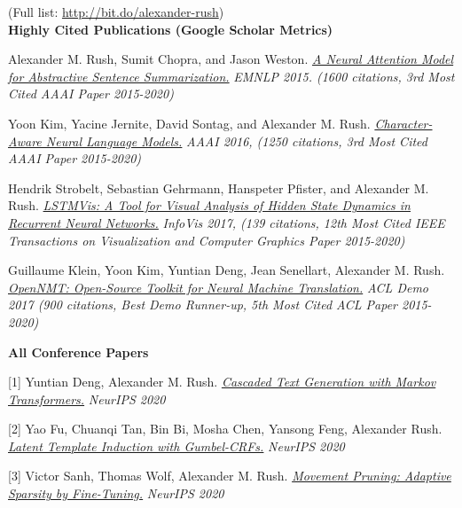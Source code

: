 \documentclass[10pt]{article}
\begin{document}

\noindent (Full list: \url{http://bit.do/alexander-rush}) \\

\medskip
\noindent
\textbf{Highly Cited Publications (Google Scholar Metrics)}

\ind Alexander M. Rush, Sumit Chopra, and Jason Weston. \emph{\href{ http://arxiv.org/pdf/1509.00685.pdf }{ A Neural Attention Model for Abstractive Sentence Summarization.} }\emph{ EMNLP 2015. (1600 citations, 3rd Most Cited AAAI Paper 2015-2020) }

\medskip


\ind Yoon Kim, Yacine Jernite, David Sontag, and Alexander M. Rush. \emph{\href{ https://arxiv.org/pdf/1508.06615v4 }{ Character-Aware Neural Language Models.} }\emph{ AAAI 2016, (1250 citations, 3rd Most Cited AAAI Paper 2015-2020) } 

\medskip

\ind Hendrik Strobelt, Sebastian Gehrmann, Hanspeter Pfister, and Alexander M. Rush. \emph{\href{ http://lstm.seas.harvard.edu/ }{ LSTMVis: A Tool for Visual Analysis of Hidden State Dynamics in Recurrent Neural Networks.} }\emph{ InfoVis 2017, (139 citations, 12th Most Cited IEEE Transactions on Visualization and Computer Graphics Paper 2015-2020) }



\medskip
\ind Guillaume Klein, Yoon Kim, Yuntian Deng, Jean Senellart, Alexander M. Rush. \emph{\href{ https://arxiv.org/abs/1701.02810 }{ OpenNMT: Open-Source Toolkit for Neural Machine Translation.} }\emph{ ACL Demo 2017 (900 citations, Best Demo Runner-up, 5th Most Cited ACL Paper 2015-2020) }

\medskip

\noindent\textbf{All Conference Papers \vspace{0.01in}}


[1] \ind Yuntian Deng, Alexander M. Rush. \emph{\href{ https://arxiv.org/pdf/2006.01112 }{ Cascaded Text Generation with Markov Transformers.} }\emph{ NeurIPS 2020 }

\medskip


[2] \ind Yao Fu, Chuanqi Tan, Bin Bi, Mosha Chen, Yansong Feng, Alexander Rush. \emph{\href{ https://github.com/FranxYao/Gumbel-CRF }{ Latent Template Induction with Gumbel-CRFs.} }\emph{ NeurIPS 2020 }

\medskip


[3] \ind Victor Sanh, Thomas Wolf, Alexander M. Rush. \emph{\href{ https://arxiv.org/pdf/2005.07683 }{ Movement Pruning: Adaptive Sparsity by Fine-Tuning.} }\emph{ NeurIPS 2020 }
\end{document}
